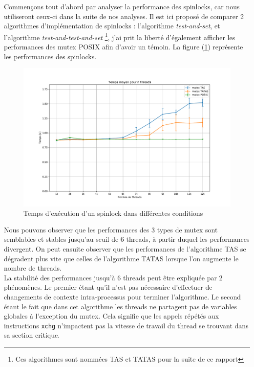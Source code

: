 Commençons tout d'abord par analyser la performance des spinlocks, car nous utiliseront ceux-ci dans la suite de nos analyses. Il est ici proposé de comparer
2 algorithmes d'implémentation de spinlocks : l'algorithme \textit{test-and-set}, et l'algorithme \textit{test-and-test-and-set} \footnote{Ces algorithmes sont nommées TAS et TATAS pour la suite de ce rapport}, j'ai prit la liberté d'également afficher les performances des mutex POSIX afin d'avoir un témoin. La figure (\ref{pic:spinlock}) représente les performances des spinlocks.\\

\begin{figure}[h]
    \centering
    \includegraphics[scale=0.4]{img/spinlock.pdf}
    \caption{Temps d'exécution d'un spinlock dans différentes conditions}
    \label{pic:spinlock}
\end{figure}

\noindent Nous pouvons observer que les performances des 3 types de mutex sont semblables et stables jusqu'au seuil de 6 threads, à partir duquel les performances divergent.
On peut ensuite observer que les performances de l'algorithme TAS se dégradent plus vite que celles de l'algorithme TATAS lorsque l'on augmente le nombre de threads. \\

\noindent La stabilité des performances jusqu'à 6 threads peut être expliquée par 2 phénomènes. Le premier étant qu'il n'est pas nécessaire d'effectuer de changements de contexte intra-processus pour terminer l'algorithme. Le second étant le fait que dans cet algorithme les threads ne partagent pas de variables globales à l'exception du mutex. Cela signifie que les appels répétés aux instructions \texttt{xchg} n'impactent pas la vitesse de travail du thread se trouvant dans sa section critique.\\[0.1cm]

